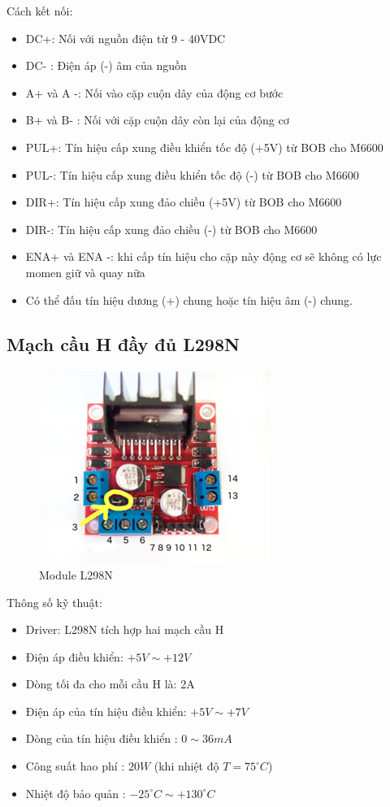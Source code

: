 Cách kết nối:
\begin{itemize}
\item DC+: Nối với nguồn điện từ 9 - 40VDC
\item DC- : Điện áp (-) âm của nguồn
\item A+ và A -: Nối vào cặp cuộn dây của động cơ bước
\item B+ và B- : Nối với cặp cuộn dây còn lại của động cơ
\item PUL+: Tín hiệu cấp xung điều khiển tốc độ (+5V) từ BOB cho M6600
\item PUL-: Tín hiệu cấp xung điều khiển tốc độ (-) từ BOB cho M6600
\item DIR+: Tín hiệu cấp xung đảo chiều (+5V) từ BOB cho M6600
\item DIR-: Tín hiệu cấp xung đảo chiều (-) từ BOB cho M6600
\item ENA+ và ENA -: khi cấp tín hiệu cho cặp này động cơ sẽ không có lực momen giữ và quay nữa
\item Có thể đấu tín hiệu dương (+) chung hoặc tín hiệu âm (-) chung.
\end{itemize}


\subsection{Mạch cầu H đầy đủ L298N}
\begin{figure}
\centering
\includegraphics[scale=1]{Chapters/Chapter4/Images/L298N}
\caption{Module L298N}
\label{fig:L298N}
\end{figure}

Thông số kỹ thuật:
\begin{itemize}
\item Driver: L298N tích hợp hai mạch cầu H
\item Điện áp điều khiển: $+5V \sim +12V$
\item Dòng tối đa cho mỗi cầu H là: 2A
\item Điện áp của tín hiệu điều khiển: $ +5V \sim +7V $
\item Dòng của tín hiệu điều khiển : $ 0 \sim 36mA $
\item Công suất hao phí : $ 20W $ (khi nhiệt độ $ T = 75^{\circ}C $)
\item Nhiệt độ bảo quản : $ -25^{\circ}C \sim +130^{\circ}C $
\end{itemize}

